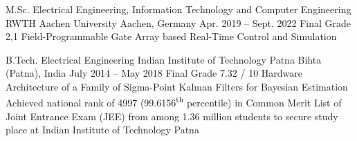 
\begin{cveducation}

\cvschool
	{M.Sc.} %
	{Electrical Engineering, Information Technology and Computer Engineering} %
	{RWTH Aachen University} %
	{Aachen, Germany} %
	{Apr. 2019 -- Sept. 2022} %
	{Final Grade 2,1} %
	{Field-Programmable Gate Array based Real-Time Control and Simulation} %
	{} %

\cvschool
	{B.Tech.} %
	{Electrical Engineering} %
	{Indian Institute of Technology Patna} %
	{Bihta (Patna), India} %
	{July 2014 -- May 2018} %
	{Final Grade 7.32 / 10} %
	{Hardware Architecture of a Family of Sigma-Point Kalman Filters for Bayesian Estimation} %
	{Achieved national rank of 4997 (99.6156\textsuperscript{th} percentile) in Common Merit List of Joint Entrance Exam (JEE) from among 1.36 million students to secure study place at Indian Institute of Technology Patna} %



\end{cveducation}
